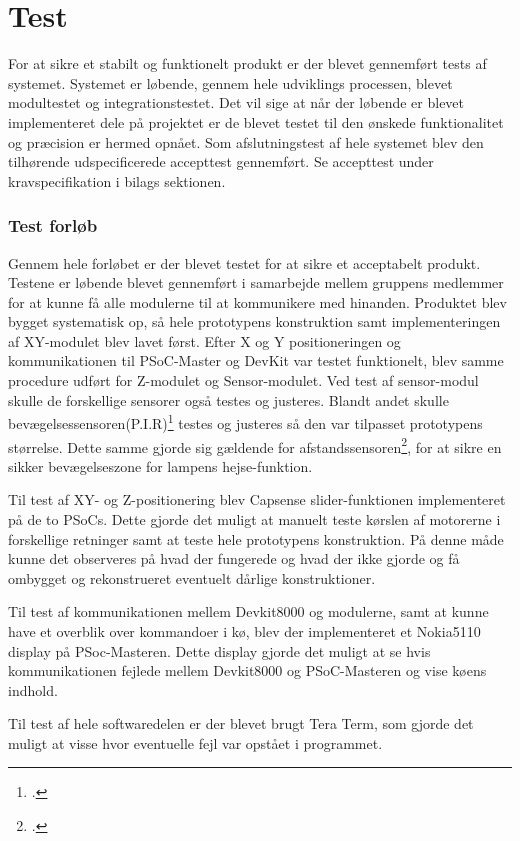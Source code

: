 \section{Test}

For at sikre et stabilt og funktionelt produkt er der blevet gennemført tests af systemet. Systemet er løbende, gennem hele udviklings processen, blevet modultestet og integrationstestet. Det vil sige at når der løbende er blevet implementeret dele på projektet er de blevet testet til den ønskede funktionalitet og præcision er hermed opnået. Som afslutningstest af hele systemet blev den tilhørende udspecificerede accepttest gennemført. Se accepttest under kravspecifikation i bilags sektionen. 

\subsubsection{Test forløb}
Gennem hele forløbet er der blevet testet for at sikre et acceptabelt produkt. Testene er løbende blevet gennemført i samarbejde mellem gruppens medlemmer for at kunne få alle modulerne til at kommunikere med hinanden. Produktet blev bygget systematisk op, så hele prototypens konstruktion samt implementeringen af XY-modulet blev lavet først. Efter X og Y positioneringen og kommunikationen til PSoC-Master og DevKit var testet funktionelt, blev samme procedure udført for Z-modulet og Sensor-modulet. Ved test af sensor-modul skulle de forskellige sensorer også testes og justeres. Blandt andet skulle bevægelsessensoren(P.I.R)\footcite{HC-SR501} testes og justeres så den var tilpasset prototypens størrelse. Dette samme gjorde sig gældende for afstandssensoren\footcite{HC-SR04}, for at sikre en sikker bevægelseszone for lampens hejse-funktion.

Til test af XY- og Z-positionering blev Capsense slider-funktionen implementeret på de to PSoCs. Dette gjorde det muligt at manuelt teste kørslen af motorerne i forskellige retninger samt at teste hele prototypens konstruktion. På denne måde kunne det observeres på hvad der fungerede og hvad der ikke gjorde og få ombygget og rekonstrueret eventuelt dårlige konstruktioner.

Til test af kommunikationen mellem Devkit8000 og modulerne, samt at kunne have et overblik over kommandoer i kø, blev der implementeret et Nokia5110 display på PSoc-Masteren. Dette display gjorde det muligt at se hvis kommunikationen fejlede mellem Devkit8000 og PSoC-Masteren og vise køens indhold.

Til test af hele softwaredelen er der blevet brugt Tera Term, som gjorde det muligt at visse hvor eventuelle fejl var opstået i programmet. %

